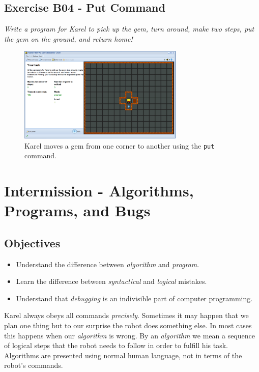 \documentclass[article,A4,12pt]{llncs}
\begin{document}
{{\subsection{Exercise B04 - Put Command}

{\em Write a program for Karel to pick up the gem, turn around, make 
two steps, put the gem on the ground, and return home!}



\begin{figure}[!ht]
\begin{center}
\includegraphics[width=0.7\textwidth]{img/b04.png}
\end{center}
\vspace{-4mm}
\caption{Karel moves a gem from one corner to another using the {\tt put} command.}
\label{fig:b04}
\vspace{-4mm}
\end{figure}
\noindent
\newpage

\section{Intermission - Algorithms, Programs, and Bugs}

\subsection{Objectives} 
 
\begin{itemize}
\item Understand the difference between {\em algorithm} and {\em program}. 
\item Learn the difference between {\em syntactical} and {\em logical} mistakes.
\item Understand that {\em debugging} is an indivisible part of computer programming.
\end{itemize}
Karel always obeys all commands {\em precisely}. Sometimes it may happen that 
we plan one thing but to our surprise the robot does something else. In most cases this 
happens when our {\em algorithm} is wrong. By an {\em algorithm} we mean a sequence of 
logical steps that the robot needs to follow in order to fulfill his task. Algorithms 
are presented using normal human language, not in terms of the robot's commands. 

}}
\end{document}
